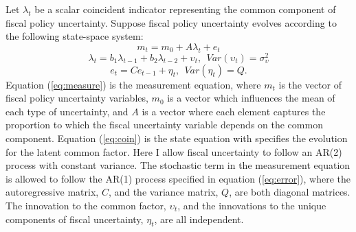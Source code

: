 \documentclass[11pt]{article}
\newcommand{\beq}{\begin{equation}}
\newcommand{\eeq}{\end{equation}}
\begin{document}
Let $\lambda_t$ be a scalar coincident indicator representing the common component of fiscal policy uncertainty.  Suppose fiscal policy uncertainty evolves according to the following state-space system:
\beq \label{eq:measure} m_t = m_0 + A \lambda_t + e_t \eeq
\beq \label{eq:coin} \lambda_t = b_1 \lambda_{t-1} + b_2 \lambda_{t-2} + \upsilon_t,~~ Var(\upsilon_t) = \sigma_\upsilon^2 \eeq
\beq \label{eq:error} e_t = C e_{t-1} + \eta_t,~~ Var(\eta_t) = Q. \eeq
Equation (\ref{eq:measure}) is the measurement equation, where $m_t$ is the vector of fiscal policy uncertainty variables, $m_0$ is a vector which influences the mean of each type of uncertainty, and $A$ is a vector where each element captures the proportion to which the fiscal uncertainty variable depends on the common component.  Equation (\ref{eq:coin}) is the state equation with specifies the evolution for the latent common factor.  Here I allow fiscal uncertainty to follow an AR(2) process with constant variance.  The stochastic term in the measurement equation is allowed to follow the AR(1) process specified in equation (\ref{eq:error}), where the autoregressive matrix, $C$, and the variance matrix, $Q$, are both diagonal matrices.  The innovation to the common factor, $\upsilon_t$, and the innovations to the unique components of fiscal uncertainty, $\eta_t$, are all independent.
\end{document}
